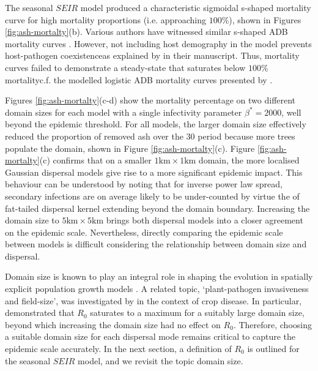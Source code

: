 The seasonal $SEIR$ model produced a characteristic sigmoidal s-shaped mortality curve for high mortality proportions (i.e. approaching $100\%$), shown in Figures \ref{fig:ash-mortalty}(b).
Various authors have witnessed similar s-shaped ADB mortality curves \cite{https://doi.org/10.1002/ppp3.11, lohmus2014ash}.
However, not including host demography in the model prevents host-pathogen coexistence\textemdash as explained by \cite{time-varying-infectivity} in their manuscript.
Thus, mortality curves failed to demonstrate a steady-state that saturates below $100\%$ mortality\textemdash c.f. the modelled logistic ADB mortality curves presented by \cite{https://doi.org/10.1002/ppp3.11}.

Figures \ref{fig:ash-mortalty}(c-d) show the mortality percentage on two different domain sizes for each model with a single infectivity parameter $\beta^*=2000$, well beyond the epidemic threshold.
For all models, the larger domain size effectively reduced the proportion of removed ash over the $30$ period because more trees populate the domain, shown in Figure \ref{fig:ash-mortalty}(c).
Figure \ref{fig:ash-mortalty}(c) confirms that on a smaller $1\mathrm{km}\times 1\mathrm{km}$ domain, the more localised Gaussian dispersal models give rise to a more significant epidemic impact.
This behaviour can be understood by noting that for inverse power law spread, secondary infections are on average likely to be under-counted
by virtue the of fat-tailed dispersal kernel extending beyond the domain boundary.
Increasing the domain size to $5\mathrm{km}\times 5\mathrm{km}$ brings both dispersal models into a closer agreement on the epidemic scale.
Nevertheless, directly comparing the epidemic scale between models is difficult considering the relationship between domain size and dispersal.

Domain size is known to play an integral role in shaping the evolution in spatially explicit population growth models \cite{tang2011asymptotic}.
A related topic, `plant-pathogen invasiveness and field-size', was investigated by \cite{mikaberidze2016invasiveness} in the context of crop disease.
In particular, \cite{mikaberidze2016invasiveness} demonstrated that $R_0$ saturates to a maximum for a suitably large domain size, beyond which increasing the domain size had no effect on $R_0$.
Therefore, choosing a suitable domain size for each dispersal mode remains critical to capture the epidemic scale accurately.
In the next section, a definition of $R_0$ is outlined for the seasonal $SEIR$ model, and we revisit the topic domain size.

